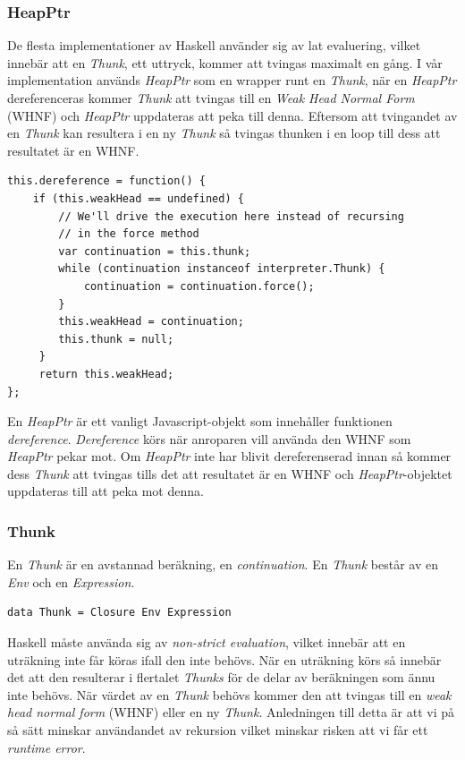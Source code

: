 \subsubsection{HeapPtr}
De flesta implementationer av Haskell använder sig av lat evaluering, vilket innebär att en \emph{Thunk}, ett uttryck, kommer att tvingas maximalt en gång. I vår implementation används \emph{HeapPtr} som en wrapper runt en \emph{Thunk}, när en \emph{HeapPtr} dereferenceras kommer \emph{Thunk} att tvingas till en \emph{Weak Head Normal Form} (WHNF) och \emph{HeapPtr} uppdateras att peka till denna. Eftersom att tvingandet av en \emph{Thunk} kan resultera i en ny \emph{Thunk} så tvingas thunken i en loop till dess att resultatet är en WHNF.

\begin{lstlisting}
this.dereference = function() {
    if (this.weakHead == undefined) {
        // We'll drive the execution here instead of recursing 
        // in the force method
        var continuation = this.thunk;
        while (continuation instanceof interpreter.Thunk) {
            continuation = continuation.force();
        }
        this.weakHead = continuation;
        this.thunk = null;
     }
     return this.weakHead;
};
\end{lstlisting}
En \emph{HeapPtr} är ett vanligt Javascript-objekt som innehåller funktionen \emph{dereference}. \emph{Dereference} körs när anroparen vill använda den WHNF som \emph{HeapPtr} pekar mot. Om \emph{HeapPtr} inte har blivit dereferenserad innan så kommer dess \emph{Thunk} att tvingas tills det att resultatet är en WHNF och \emph{HeapPtr}-objektet uppdateras till att peka mot denna.

\subsubsection{Thunk}
En \emph{Thunk} är en avstannad beräkning, en \emph{continuation}. En \emph{Thunk} består av en \emph{Env} och en \emph{Expression}.

\begin{lstlisting}
data Thunk = Closure Env Expression
\end{lstlisting}

Haskell måste använda sig av \emph{non-strict evaluation}, vilket innebär att en uträkning inte får köras ifall den inte behövs. När en uträkning körs så innebär det att den resulterar i flertalet \emph{Thunks} för de delar av beräkningen som ännu inte behövs. När värdet av en \emph{Thunk} behövs kommer den att tvingas till en \emph{weak head normal form} (WHNF) eller en ny \emph{Thunk}. Anledningen till detta är att vi på så sätt minskar användandet av rekursion vilket minskar risken att vi får ett \emph{runtime error}.

